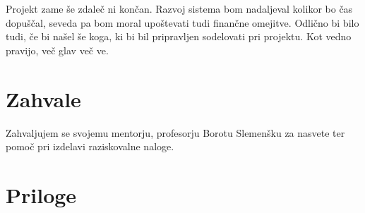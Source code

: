 \documentclass[11pt]{article}
\begin{document}
Projekt zame še zdaleč ni končan. Razvoj sistema bom nadaljeval kolikor bo čas dopuščal, seveda pa bom moral upoštevati tudi finančne omejitve. Odlično bi bilo tudi, če bi našel še koga, ki bi bil pripravljen sodelovati pri projektu. Kot vedno pravijo, več glav več ve.
\newpage
\clearpage



\begin{flushleft}


\end{flushleft}
\newpage
\section{Zahvale}
Zahvaljujem se svojemu mentorju, profesorju Borotu Slemenšku za nasvete ter pomoč pri izdelavi raziskovalne naloge.
\newpage
\section{Priloge}
\end{document}
